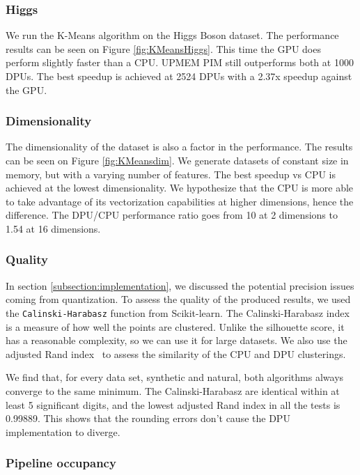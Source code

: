 \subsubsection{Higgs}

We run the K-Means algorithm on the Higgs Boson dataset. The performance results can be seen on Figure \ref{fig:KMeansHiggs}. This time the GPU does perform slightly faster than a CPU. UPMEM PIM still outperforms both at 1000 DPUs. The best speedup is achieved at 2524 DPUs with a 2.37x speedup against the GPU.

\subsubsection{Dimensionality}

The dimensionality of the dataset is also a factor in the performance. The results can be seen on Figure \ref{fig:KMeansdim}. We generate datasets of constant size in memory, but with a varying number of features. The best speedup vs CPU is achieved at the lowest dimensionality. We hypothesize that the CPU is more able to take advantage of its vectorization capabilities at higher dimensions, hence the difference. The DPU/CPU performance ratio goes from 10 at 2 dimensions to 1.54 at 16 dimensions.

\subsubsection{Quality}

In section \ref{subsection:implementation}, we discussed the potential precision issues coming from quantization. To assess the quality of the produced results, we used the \verb|Calinski-Harabasz| function from Scikit-learn. The Calinski-Harabasz index~\cite{calinski1974dendrite} is a measure of how well the points are clustered. Unlike the silhouette score, it has a reasonable complexity, so we can use it for large datasets. We also use the adjusted Rand index~\cite{hubert1985comparing} to assess the similarity of the CPU and DPU clusterings.

We find that, for every data set, synthetic and natural, both algorithms always converge to the same minimum. The Calinski-Harabasz are identical within at least 5 significant digits, and the lowest adjusted Rand index in all the tests is 0.99889. This shows that the rounding errors don't cause the DPU implementation to diverge.

\subsubsection{Pipeline occupancy}


